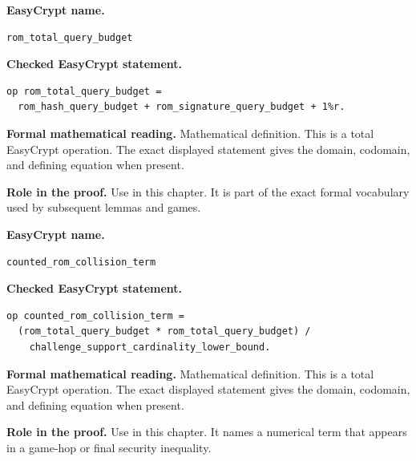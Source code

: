 \begin{formaldefinition}
\noindent\textbf{EasyCrypt name.}
\begin{lstlisting}[language=EasyCrypt,basicstyle=\ttfamily\scriptsize]
rom_total_query_budget
\end{lstlisting}
\noindent\textbf{Checked EasyCrypt statement.}
\begin{lstlisting}[language=EasyCrypt,basicstyle=\ttfamily\scriptsize]
op rom_total_query_budget =
  rom_hash_query_budget + rom_signature_query_budget + 1%r.
\end{lstlisting}
\noindent\textbf{Formal mathematical reading.}
Mathematical definition. This is a total EasyCrypt operation.  The exact displayed statement gives the domain, codomain, and defining equation when present.

\noindent\textbf{Role in the proof.}
Use in this chapter. It is part of the exact formal vocabulary used by subsequent lemmas and games.

\end{formaldefinition}

\begin{formaldefinition}
\noindent\textbf{EasyCrypt name.}
\begin{lstlisting}[language=EasyCrypt,basicstyle=\ttfamily\scriptsize]
counted_rom_collision_term
\end{lstlisting}
\noindent\textbf{Checked EasyCrypt statement.}
\begin{lstlisting}[language=EasyCrypt,basicstyle=\ttfamily\scriptsize]
op counted_rom_collision_term =
  (rom_total_query_budget * rom_total_query_budget) /
    challenge_support_cardinality_lower_bound.
\end{lstlisting}
\noindent\textbf{Formal mathematical reading.}
Mathematical definition. This is a total EasyCrypt operation.  The exact displayed statement gives the domain, codomain, and defining equation when present.

\noindent\textbf{Role in the proof.}
Use in this chapter. It names a numerical term that appears in a game-hop or final security inequality.

\end{formaldefinition}

